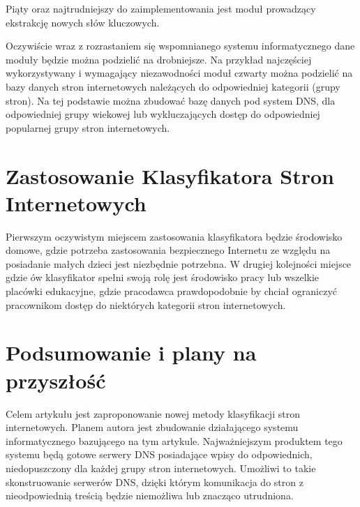\documentclass[9pt,a4paper]{extarticle}
\begin{document}
\begin{multicols}{2}
Piąty oraz najtrudniejszy do zaimplementowania jest moduł prowadzący ekstrakcję nowych słów kluczowych.

Oczywiście wraz z rozrastaniem się wspomnianego systemu informatycznego dane moduły będzie można podzielić na drobniejsze. Na przykład najczęściej wykorzystywany i wymagający niezawodności moduł czwarty można podzielić na bazy danych stron internetowych należących do odpowiedniej kategorii (grupy stron). Na tej podstawie można zbudować bazę danych pod system DNS, dla odpowiedniej grupy wiekowej lub wykluczających dostęp do odpowiedniej popularnej grupy stron internetowych.

\section{Zastosowanie Klasyfikatora Stron Internetowych}

Pierwszym oczywistym miejscem zastosowania klasyfikatora będzie środowisko domowe, gdzie potrzeba zastosowania bezpiecznego Internetu ze względu na posiadanie małych dzieci jest niezbędnie potrzebna. W drugiej kolejności miejsce gdzie ów klasyfikator spełni swoją rolę jest środowisko pracy lub wszelkie placówki edukacyjne, gdzie pracodawca prawdopodobnie by chciał ograniczyć pracownikom dostęp do niektórych kategorii stron internetowych.

\section{Podsumowanie i plany na przyszłość}

Celem artykułu jest zaproponowanie nowej metody klasyfikacji stron internetowych. Planem autora jest zbudowanie działającego systemu informatycznego bazującego na tym artykule. Najważniejszym produktem tego systemu będą gotowe serwery DNS posiadające wpisy do odpowiednich, niedopuszczony dla każdej grupy stron internetowych. Umożliwi to takie skonstruowanie serwerów DNS, dzięki którym komunikacja do stron z nieodpowiednią treścią będzie niemożliwa lub znacząco utrudniona.







\end{multicols}
\end{document}
